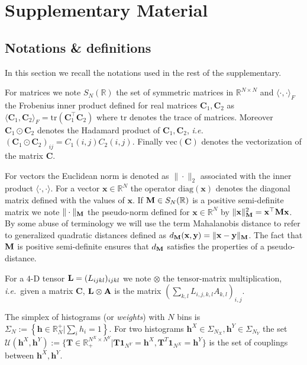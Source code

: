 \documentclass{article}
\newcommand{\scalar}[2]{\langle #1 , #2 \rangle}
\def\vh{{\bm{h}}}
\def\mC{{\bm{C}}}
\def\mT{{\bm{T}}}
\newcommand{\R}{\mathbb{R}}
\def\Mbf{{\bf M}}
\def\L{{\bf L}}
\def\R{{\mathbb{R}}}
\def\Abf{{\mathbf{A}}}
\def\diag{{\text{diag}}}
\def\vec{{\text{vec}}}
\def\tr{{\text{tr}}}
\newcommand{\xbf}{\mathbf{x}}
\newcommand{\ybf}{\mathbf{y}}
\newcommand{\ie}{\textit{i.e.}}
\begin{document}
	
	
	\newpage
	
	\onecolumn
	\section{Supplementary Material}
	\subsection{Notations \& definitions}\label{sec:defs}
	In this section we recall the notations used in the rest of the supplementary. 
	
	For matrices we note  $S_N(\R)$ the set of symmetric matrices in $\R^{N\times N}$ and $\scalar{\cdot}{\cdot}_F$ the Frobenius inner product defined for real matrices $\mC_1,\mC_2$ as $\scalar{\mC_1}{\mC_2}_F=\tr(\mC_1^{\top}\mC_2)$ where $\tr$ denotes the trace of matrices. Moreover $\mC_1\odot\mC_2$ denotes the Hadamard product of $\mC_1,\mC_2$, \ie\ $(\mC_1\odot\mC_2)_{ij}=C_1(i,j)C_2(i,j)$. Finally $\vec(\mC)$ denotes the vectorization of the matrix $\mC$.
	
	For vectors the Euclidean norm is denoted as $\|\cdot\|_2$ associated with the inner product $\scalar{\cdot}{\cdot}$. For a vector $\xbf \in \R^{N}$ the operator $\diag(\xbf)$ denotes the diagonal matrix defined with the values of $\xbf$. If $\Mbf \in S_N(\R)$ is a positive semi-definite matrix we note $\|\cdot\|_{\Mbf}$ the pseudo-norm defined for $\xbf\in \R^{N}$ by $\|\xbf\|^{2}_{\Mbf}=\xbf^{\top}\Mbf\xbf$. By some abuse of terminology we will use the term Mahalanobis distance to refer to generalized quadratic distances defined as $d_{\Mbf}(\xbf,\ybf)=\|\xbf-\ybf\|_{\Mbf}$. The fact that $\Mbf$ is positive semi-definite ensures that $d_{\Mbf}$ satisfies the
	properties of a pseudo-distance. 
	
	For a $4$-D tensor $\L=(L_{ijkl})_{ijkl}$ we note $\otimes$ the tensor-matrix multiplication, \ie\ given a matrix $\mC$, $\L \otimes \Abf$ is the matrix $\left(\sum_{k,l} L_{i,j,k,l}A_{k,l}\right)_{i,j}$.
	
	The simplex of histograms (or \emph{weights}) with $N$ bins is $\Sigma_N := \left\{\mathbf{h}\in \mathbb{R}^+_N| \sum_i h_i = 1 \right\}$. For two histograms $\vh^X \in \Sigma_{N_X},\vh^Y \in \Sigma_{N_Y}$ the set $\mathcal{U}(\vh^X,\vh^Y):= \{\mT \in \R_{+}^{N^X\times N^Y}|\mT\mathbf{1}_{N^{Y}}=\vh^X, \mT^T\mathbf{1}_{N^{X}}=\vh^Y\}$ is the set of couplings between $\vh^X,\vh^Y$. 
	
\end{document}
